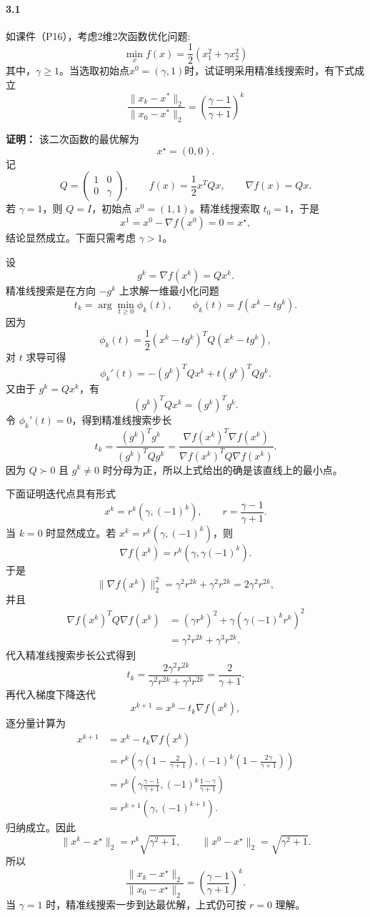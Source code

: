 \documentclass[12pt,a4paper]{article}
\begin{document}
\paragraph{3.1} 如课件（P16），考虑2维2次函数优化问题:
$$\min_x f(x)=\frac{1}{2}\left(x_1^2+\gamma x_2^2\right)$$
其中，$\gamma \geq 1$。当选取初始点$x^{0}=(\gamma,1)$时，试证明采用精准线搜索时，有下式成立
$$\frac{\|{x_k-x^*}\|_2}{\|{x_0-x^*}\|_2}=
\left(\frac{\gamma-1}{\gamma+1}\right)^k$$

\textbf{证明：}
该二次函数的最优解为
\[
  x^\star=(0,0).
\]
记
\[
  Q=\begin{pmatrix}1&0\\0&\gamma\end{pmatrix},
  \qquad
  f(x)=\frac12x^TQx,\qquad
  \nabla f(x)=Qx.
\]
若 $\gamma=1$，则 $Q=I$，初始点 $x^0=(1,1)$。精准线搜索取
$t_0=1$，于是
\[
  x^1=x^0-\nabla f(x^0)=0=x^\star,
\]
结论显然成立。下面只需考虑 $\gamma>1$。

设
\[
  g^k=\nabla f(x^k)=Qx^k.
\]
精准线搜索是在方向 $-g^k$ 上求解一维最小化问题
\[
  t_k=\arg\min_{t\geq0}\phi_k(t),
  \qquad
  \phi_k(t)=f(x^k-tg^k).
\]
因为
\[
  \phi_k(t)=\frac12(x^k-tg^k)^TQ(x^k-tg^k),
\]
对 $t$ 求导可得
\[
  \phi_k'(t)
  =-(g^k)^TQx^k+t(g^k)^TQg^k.
\]
又由于 $g^k=Qx^k$，有
\[
  (g^k)^TQx^k=(g^k)^Tg^k.
\]
令 $\phi_k'(t)=0$，得到精准线搜索步长
\[
  t_k
  =\frac{(g^k)^Tg^k}{(g^k)^TQg^k}
  =\frac{\nabla f(x^k)^T\nabla f(x^k)}
  {\nabla f(x^k)^TQ\nabla f(x^k)}.
\]
因为 $Q\succ0$ 且 $g^k\neq0$ 时分母为正，所以上式给出的确是该直线上的最小点。

下面证明迭代点具有形式
\[
  x^k=r^k(\gamma,(-1)^k),
  \qquad
  r=\frac{\gamma-1}{\gamma+1}.
\]
当 $k=0$ 时显然成立。若 $x^k=r^k(\gamma,(-1)^k)$，则
\[
  \nabla f(x^k)=r^k(\gamma,\gamma(-1)^k).
\]
于是
\[
  \|\nabla f(x^k)\|_2^2
  =\gamma^2r^{2k}+\gamma^2r^{2k}
  =2\gamma^2r^{2k},
\]
并且
\[
\begin{aligned}
  \nabla f(x^k)^TQ\nabla f(x^k)
  &=(\gamma r^k)^2+\gamma(\gamma(-1)^kr^k)^2\\
  &=\gamma^2r^{2k}+\gamma^3r^{2k}.
\end{aligned}
\]
代入精准线搜索步长公式得到
\[
  t_k=\frac{2\gamma^2r^{2k}}
  {\gamma^2r^{2k}+\gamma^3r^{2k}}
  =\frac{2}{\gamma+1}.
\]
再代入梯度下降迭代
\[
  x^{k+1}=x^k-t_k\nabla f(x^k),
\]
逐分量计算为
\[
\begin{aligned}
  x^{k+1}
  &=x^k-t_k\nabla f(x^k)\\
  &=r^k\left(
    \gamma\left(1-\frac{2}{\gamma+1}\right),
    (-1)^k\left(1-\frac{2\gamma}{\gamma+1}\right)
  \right)\\
  &=r^k\left(
    \gamma\frac{\gamma-1}{\gamma+1},
    (-1)^k\frac{1-\gamma}{\gamma+1}
  \right)\\
  &=r^{k+1}(\gamma,(-1)^{k+1}).
\end{aligned}
\]
归纳成立。因此
\[
  \|x^k-x^\star\|_2
  =r^k\sqrt{\gamma^2+1},
  \qquad
  \|x^0-x^\star\|_2=\sqrt{\gamma^2+1}.
\]
所以
\[
  \frac{\|x_k-x^\star\|_2}{\|x_0-x^\star\|_2}
  =
  \left(\frac{\gamma-1}{\gamma+1}\right)^k.
\]
当 $\gamma=1$ 时，精准线搜索一步到达最优解，上式仍可按 $r=0$ 理解。
\end{document}
